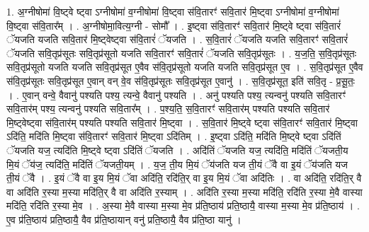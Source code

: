 \documentclass[17pt]{extarticle}
\begin{document}
1. अ॒ग्नीषोमा॑ वि॒ष्ट्वे ष्ट्वा ऽग्नीषोमा॑ व॒ग्नीषोमा॑ वि॒ष्ट्वा स॑वि॒तारꣳ॑ सवि॒तार॑ मि॒ष्ट्वा ऽग्नीषोमा॑ व॒ग्नीषोमा॑ वि॒ष्ट्वा स॑वि॒तार᳚म् । . अ॒ग्नीषोमा॒वित्य॒ग्नी - सोमौ᳚ । . इ॒ष्ट्वा स॑वि॒तारꣳ॑ सवि॒तार॑ मि॒ष्ट्वे ष्ट्वा स॑वि॒तारं॑ ॅयजति यजति सवि॒तार॑ मि॒ष्ट्वेष्ट्वा स॑वि॒तारं॑ ॅयजति । . स॒वि॒तारं॑ ॅयजति यजति सवि॒तारꣳ॑ सवि॒तारं॑ ॅयजति सवि॒तृप्र॑सूतः सवि॒तृप्र॑सूतो यजति सवि॒तारꣳ॑ सवि॒तारं॑ ॅयजति सवि॒तृप्र॑सूतः । . य॒ज॒ति॒ स॒वि॒तृप्र॑सूतः सवि॒तृप्र॑सूतो यजति यजति सवि॒तृप्र॑सूत ए॒वैव स॑वि॒तृप्र॑सूतो यजति यजति सवि॒तृप्र॑सूत ए॒व । . स॒वि॒तृप्र॑सूत ए॒वैव स॑वि॒तृप्र॑सूतः सवि॒तृप्र॑सूत ए॒वान् वन् वे॒व स॑वि॒तृप्र॑सूतः सवि॒तृप्र॑सूत ए॒वानु॑ । . स॒वि॒तृप्र॑सूत॒ इति॑ सवि॒तृ - प्र॒सू॒तः॒ । . ए॒वान् वन्वे॒ वैवानु॑ पश्यति पश्य॒ त्यन्वे॒ वैवानु॑ पश्यति । . अनु॑ पश्यति पश्य॒ त्यन्वनु॑ पश्यति सवि॒तारꣳ॑ सवि॒तार॑म् पश्य॒ त्यन्वनु॑ पश्यति सवि॒तार᳚म् । . प॒श्य॒ति॒ स॒वि॒तारꣳ॑ सवि॒तार॑म् पश्यति पश्यति सवि॒तार॑ मि॒ष्ट्वेष्ट्वा स॑वि॒तार॑म् पश्यति पश्यति सवि॒तार॑ मि॒ष्ट्वा । . स॒वि॒तार॑ मि॒ष्ट्वे ष्ट्वा स॑वि॒तारꣳ॑ सवि॒तार॑ मि॒ष्ट्वा ऽदि॑ति॒ मदि॑ति मि॒ष्ट्वा स॑वि॒तारꣳ॑ सवि॒तार॑ मि॒ष्ट्वा ऽदि॑तिम् । . इ॒ष्ट्वा ऽदि॑ति॒ मदि॑ति मि॒ष्ट्वे ष्ट्वा ऽदि॑तिं ॅयजति यज॒ त्यदि॑ति मि॒ष्ट्वे ष्ट्वा ऽदि॑तिं ॅयजति । . अदि॑तिं ॅयजति यज॒ त्यदि॑ति॒ मदि॑तिं ॅयजती॒य मि॒यं ॅय॑ज॒ त्यदि॑ति॒ मदि॑तिं ॅयजती॒यम् । . य॒ज॒ ती॒य मि॒यं ॅय॑जति यज ती॒यं ॅवै वा इ॒यं ॅय॑जति यज ती॒यं ॅवै । . इ॒यं ॅवै वा इ॒य मि॒यं ॅवा अदि॑ति॒ रदि॑ति॒र् वा इ॒य मि॒यं ॅवा अदि॑तिः । . वा अदि॑ति॒ रदि॑ति॒र् वै वा अदि॑ति र॒स्या म॒स्या मदि॑ति॒र् वै वा अदि॑ति र॒स्याम् । . अदि॑ति र॒स्या म॒स्या मदि॑ति॒ रदि॑ति र॒स्या मे॒वै वास्या मदि॑ति॒ रदि॑ति र॒स्या मे॒व । . अ॒स्या मे॒वै वास्या म॒स्या मे॒व प्र॑ति॒ष्ठाय॑ प्रति॒ष्ठायै॒ वास्या म॒स्या मे॒व प्र॑ति॒ष्ठाय॑ । . ए॒व प्र॑ति॒ष्ठाय॑ प्रति॒ष्ठायै॒ वैव प्र॑ति॒ष्ठायान् वनु॑ प्रति॒ष्ठायै॒ वैव प्र॑ति॒ष्ठा यानु॑ । \newline
\end{document}
